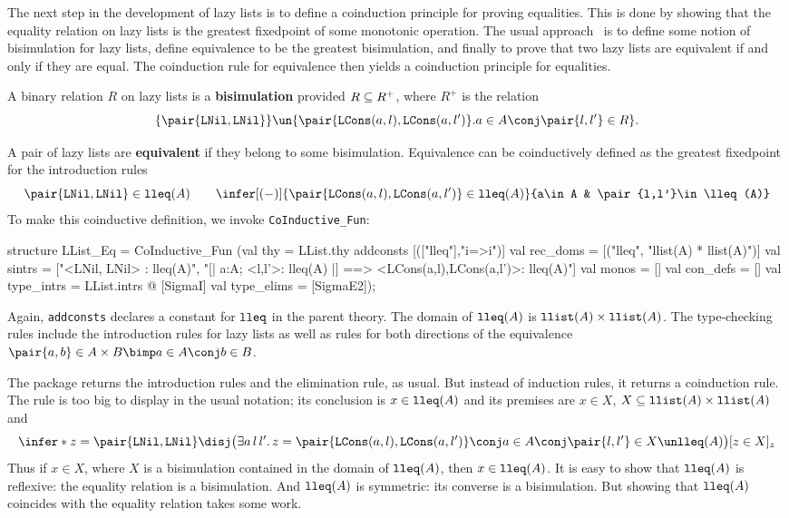 The next step in the development of lazy lists is to define a coinduction
principle for proving equalities.  This is done by showing that the equality
relation on lazy lists is the greatest fixedpoint of some monotonic
operation.  The usual approach~\cite{pitts94} is to define some notion of 
bisimulation for lazy lists, define equivalence to be the greatest
bisimulation, and finally to prove that two lazy lists are equivalent if and
only if they are equal.  The coinduction rule for equivalence then yields a
coinduction principle for equalities.

A binary relation $R$ on lazy lists is a {\bf bisimulation} provided $R\subseteq
R^+$, where $R^+$ is the relation
\[ \{\pair{\LNil,\LNil}\} \un 
   \{\pair{\LCons(a,l),\LCons(a,l')} . a\in A \conj \pair{l,l'}\in R\}.
\]

A pair of lazy lists are {\bf equivalent} if they belong to some bisimulation. 
Equivalence can be coinductively defined as the greatest fixedpoint for the
introduction rules
\[  \pair{\LNil,\LNil} \in\lleq(A)  \qquad 
    \infer[(-)]{\pair{\LCons(a,l),\LCons(a,l')} \in\lleq(A)}
          {a\in A & \pair{l,l'}\in \lleq(A)}
\]
To make this coinductive definition, we invoke \verb|CoInductive_Fun|:
\begin{ttbox}
structure LList_Eq = CoInductive_Fun
 (val thy = LList.thy addconsts [(["lleq"],"i=>i")]
  val rec_doms   = [("lleq", "llist(A) * llist(A)")]
  val sintrs     = 
       ["<LNil, LNil> : lleq(A)",
        "[| a:A; <l,l'>: lleq(A) |] ==> <LCons(a,l),LCons(a,l')>: lleq(A)"]
  val monos      = []
  val con_defs   = []
  val type_intrs = LList.intrs @ [SigmaI]
  val type_elims = [SigmaE2]);
\end{ttbox}
Again, {\tt addconsts} declares a constant for $\hbox{\tt lleq}$ in the parent theory. 
The domain of $\hbox{\tt lleq}(A)$ is $\hbox{\tt llist}(A)\times\hbox{\tt llist}(A)$.  The type-checking
rules include the introduction rules for lazy lists as well as rules
for both directions of the equivalence
$\pair{a,b}\in A\times B \bimp a\in A \conj b\in B$.

The package returns the introduction rules and the elimination rule, as
usual.  But instead of induction rules, it returns a coinduction rule.
The rule is too big to display in the usual notation; its conclusion is
$x\in\hbox{\tt lleq}(A)$ and its premises are $x\in X$, 
${X\subseteq\hbox{\tt llist}(A)\times\hbox{\tt llist}(A)}$ and
\[ \infer*{z=\pair{\LNil,\LNil}\disj \bigl(\exists a\,l\,l'.\,
      z=\pair{\LCons(a,l),\LCons(a,l')} \conj 
      a\in A \conj\pair{l,l'}\in X\un\lleq(A) \bigr)
    }{[z\in X]_z}
\]
Thus if $x\in X$, where $X$ is a bisimulation contained in the
domain of $\hbox{\tt lleq}(A)$, then $x\in\hbox{\tt lleq}(A)$.  It is easy to show that
$\hbox{\tt lleq}(A)$ is reflexive: the equality relation is a bisimulation.  And
$\hbox{\tt lleq}(A)$ is symmetric: its converse is a bisimulation.  But showing that
$\hbox{\tt lleq}(A)$ coincides with the equality relation takes some work.

